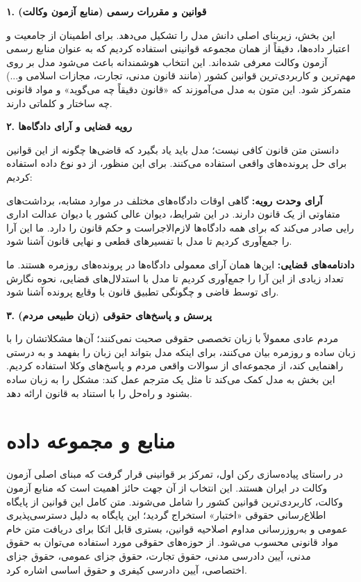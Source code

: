 \documentclass[12pt,a4paper]{report}
\begin{document}
	\textbf{۱. قوانین و مقررات رسمی (منابع آزمون وکالت)}
	
	این بخش، زیربنای اصلی دانش مدل را تشکیل می‌دهد. برای اطمینان از جامعیت و اعتبار داده‌ها، دقیقاً از همان مجموعه قوانینی استفاده کردیم که به عنوان منابع رسمی آزمون وکالت معرفی شده‌اند. این انتخاب هوشمندانه باعث می‌شود مدل بر روی مهم‌ترین و کاربردی‌ترین قوانین کشور (مانند قانون مدنی، تجارت، مجازات اسلامی و...) متمرکز شود. این متون به مدل می‌آموزند که «قانون دقیقاً چه می‌گوید» و مواد قانونی چه ساختار و کلماتی دارند.
	
	\textbf{۲. رویه قضایی و آرای دادگاه‌ها}
	
	دانستن متن قانون کافی نیست؛ مدل باید یاد بگیرد که قاضی‌ها چگونه از این قوانین برای حل پرونده‌های واقعی استفاده می‌کنند. برای این منظور، از دو نوع داده استفاده کردیم:
	
	\textbf{آرای وحدت رویه:} گاهی اوقات دادگاه‌های مختلف در موارد مشابه، برداشت‌های متفاوتی از یک قانون دارند. در این شرایط، دیوان عالی کشور یا دیوان عدالت اداری رایی صادر می‌کند که برای همه دادگاه‌ها لازم‌الاجراست و حکم قانون را دارد. ما این آرا را جمع‌آوری کردیم تا مدل با تفسیرهای قطعی و نهایی قانون آشنا شود.
	
	\textbf{دادنامه‌های قضایی:} این‌ها همان آرای معمولی دادگاه‌ها در پرونده‌های روزمره هستند. ما تعداد زیادی از این آرا را جمع‌آوری کردیم تا مدل با استدلال‌های قضایی، نحوه نگارش رای توسط قاضی و چگونگی تطبیق قانون با وقایع پرونده آشنا شود.
	
	\textbf{۳. پرسش و پاسخ‌های حقوقی (زبان طبیعی مردم)}
	
	مردم عادی معمولاً با زبان تخصصی حقوقی صحبت نمی‌کنند؛ آن‌ها مشکلاتشان را با زبان ساده و روزمره بیان می‌کنند، برای اینکه مدل بتواند این زبان را بفهمد و به درستی راهنمایی کند، از مجموعه‌ای از سوالات واقعی مردم و پاسخ‌های وکلا استفاده کردیم. این بخش به مدل کمک می‌کند تا مثل یک مترجم عمل کند: مشکل را به زبان ساده بشنود و راه‌حل را با استناد به قانون ارائه دهد.
	
	\section{منابع و مجموعه داده}
	
	در راستای پیاده‌سازی رکن اول، تمرکز بر قوانینی قرار گرفت که مبنای اصلی آزمون وکالت در ایران هستند. این انتخاب از آن جهت حائز اهمیت است که منابع آزمون وکالت، کاربردی‌ترین قوانین کشور را شامل می‌شوند. متن کامل این قوانین از پایگاه اطلاع‌رسانی حقوقی «اختبار» استخراج گردید؛ این پایگاه به دلیل دسترسی‌پذیری عمومی و به‌روزرسانی مداوم اصلاحیه قوانین، بستری قابل اتکا برای دریافت متن خام مواد قانونی محسوب می‌شود. از حوزه‌های حقوقی مورد استفاده می‌توان به حقوق مدنی، آیین دادرسی مدنی، حقوق تجارت، حقوق جزای عمومی، حقوق جزای اختصاصی، آیین دادرسی کیفری و حقوق اساسی اشاره کرد.
	
\end{document}

